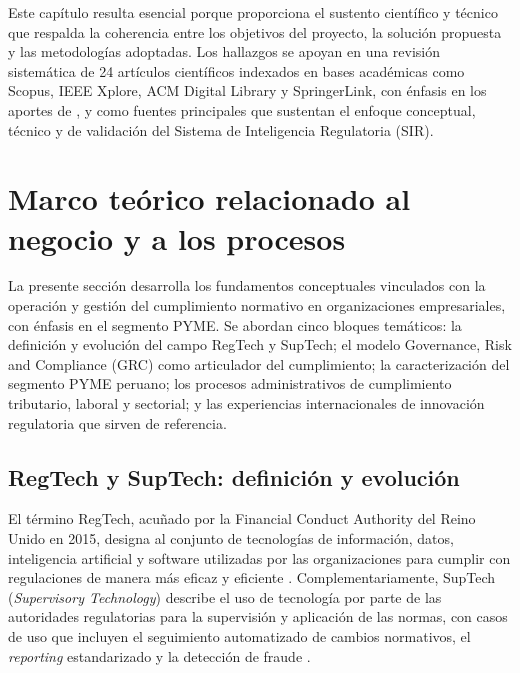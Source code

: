 \documentclass[12pt,a4paper,oneside]{report}
\begin{document}
Este capítulo resulta esencial porque proporciona el sustento científico y técnico que respalda la coherencia entre los objetivos del proyecto, la solución propuesta y las metodologías adoptadas. Los hallazgos se apoyan en una revisión sistemática de 24 artículos científicos indexados en bases académicas como Scopus, IEEE Xplore, ACM Digital Library y SpringerLink, con énfasis en los aportes de \textcite{singh2022}, \textcite{raju2025} y \textcite{noronha2025} como fuentes principales que sustentan el enfoque conceptual, técnico y de validación del Sistema de Inteligencia Regulatoria (SIR).

\section{Marco teórico relacionado al negocio y a los procesos}\label{sec:marco-teorico-negocio-procesos}

La presente sección desarrolla los fundamentos conceptuales vinculados con la operación y gestión del cumplimiento normativo en organizaciones empresariales, con énfasis en el segmento PYME. Se abordan cinco bloques temáticos: la definición y evolución del campo RegTech y SupTech; el modelo Governance, Risk and Compliance (GRC) como articulador del cumplimiento; la caracterización del segmento PYME peruano; los procesos administrativos de cumplimiento tributario, laboral y sectorial; y las experiencias internacionales de innovación regulatoria que sirven de referencia.

\subsection{RegTech y SupTech: definición y evolución}\label{subsec:regtech-suptech-definicion-evolucion}

El término RegTech, acuñado por la Financial Conduct Authority del Reino Unido en 2015, designa al conjunto de tecnologías de información, datos, inteligencia artificial y software utilizadas por las organizaciones para cumplir con regulaciones de manera más eficaz y eficiente \parencite{elkhoury2025}. Complementariamente, SupTech (\textit{Supervisory Technology}) describe el uso de tecnología por parte de las autoridades regulatorias para la supervisión y aplicación de las normas, con casos de uso que incluyen el seguimiento automatizado de cambios normativos, el \textit{reporting} estandarizado y la detección de fraude \parencite{chao2022}.
\end{document}
